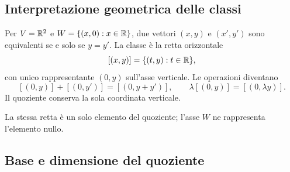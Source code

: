 \subsection{Interpretazione geometrica delle classi}

\begin{esempio}
Per $V=\mathbb{R}^2$ e $W=\{(x,0):x\in\mathbb{R}\}$, due vettori $(x,y)$ e $(x',y')$ sono equivalenti se e solo se $y=y'$. La classe è la retta orizzontale
\[
  [(x,y)]=\{(t,y):t\in\mathbb{R}\},
\]
con unico rappresentante $(0,y)$ sull'asse verticale. Le operazioni diventano
\[
  [(0,y)]+[(0,y')]=[(0,y+y')],\qquad\lambda[(0,y)]=[(0,\lambda y)].
\]
Il quoziente conserva la sola coordinata verticale.
\end{esempio}
\begin{schema}

La stessa retta è un solo elemento del quoziente; l'asse $W$ ne rappresenta l'elemento nullo.
\end{schema}

\subsection{Base e dimensione del quoziente}

